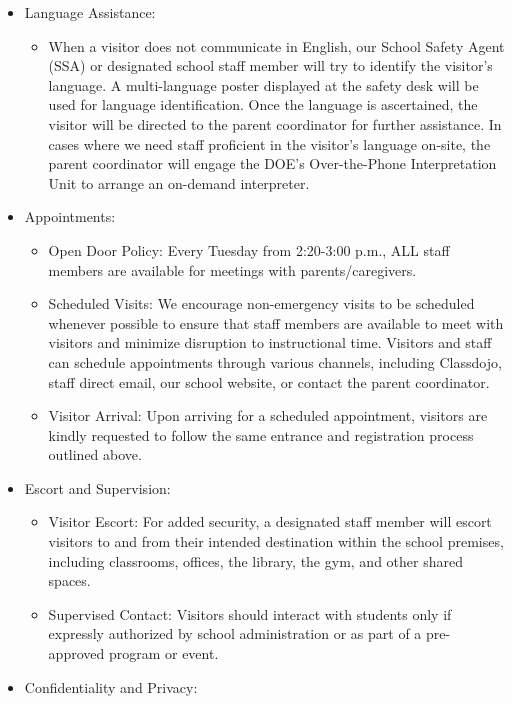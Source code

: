 \documentclass[12pt,letterpaper]{article}
\begin{document}
\begin{itemize}
	\item Language Assistance:
		\begin{itemize}
		\item When a visitor does not communicate in English, our School Safety Agent (SSA) or designated school staff member will try to identify the visitor's language. A multi-language poster displayed at the safety desk will be used for language identification. Once the language is ascertained, the visitor will be directed to the parent coordinator for further assistance. In cases where we need staff proficient in the visitor's language on-site, the parent coordinator will engage the DOE's Over-the-Phone Interpretation Unit to arrange an on-demand interpreter.
		\end{itemize}
\pagebreak
\vspace*{1.5cm}
	\item Appointments:
		\begin{itemize}
		\item Open Door Policy: Every Tuesday from 2:20-3:00 p.m., ALL staff members are available for meetings with parents/caregivers.
		\item Scheduled Visits: We encourage non-emergency visits to be scheduled whenever possible to ensure that staff members are available to meet with visitors and minimize disruption to instructional time. Visitors and staff can schedule appointments through various channels, including Classdojo, staff direct email, our school website, or contact the parent coordinator.
		\item Visitor Arrival: Upon arriving for a scheduled appointment, visitors are kindly requested to follow the same entrance and registration process outlined above.
		\end{itemize}
	\item Escort and Supervision:
		\begin{itemize}
		\item Visitor Escort: For added security, a designated staff member will escort visitors to and from their intended destination within the school premises, including classrooms, offices, the library, the gym, and other shared spaces.
		\item Supervised Contact: Visitors should interact with students only if expressly authorized by school administration or as part of a pre-approved program or event.
		\end{itemize}
	\item Confidentiality and Privacy:
		\begin{itemize}

\end{itemize}
\end{itemize}
\end{document}
